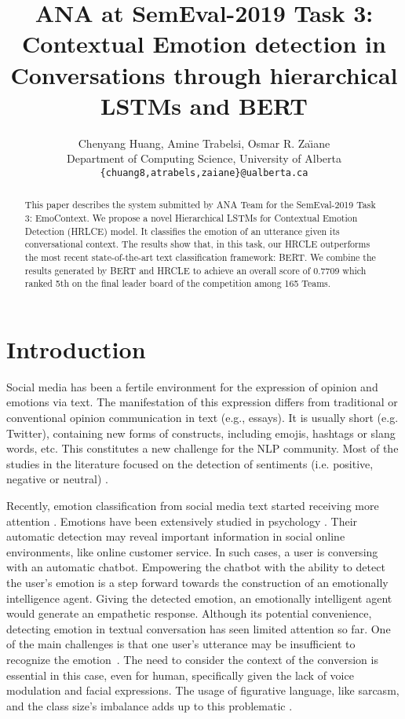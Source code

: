 \documentclass[11pt,a4paper]{article}
\title{ANA at SemEval-2019 Task 3:  Contextual Emotion detection in Conversations through hierarchical LSTMs and BERT }
\author{Chenyang Huang, Amine Trabelsi, Osmar R. Za\"{\i}ane\\
  Department of Computing Science, University of Alberta \\
  {\tt \{chuang8,atrabels,zaiane\}@ualberta.ca} \\}
\date{}
\begin{document}
\maketitle

\begin{abstract}
    This paper describes the system submitted by ANA Team for the SemEval-2019 Task 3: EmoContext.
    We propose a novel Hierarchical LSTMs for Contextual Emotion Detection (HRLCE) model. 
It classifies the emotion of an utterance given its conversational context.
    The results show that, in this task, our HRCLE outperforms the most recent state-of-the-art text classification framework: BERT. We combine the results generated by BERT and HRCLE to achieve an overall score of 0.7709 which ranked 5th on the final leader board of the competition among 165 Teams.

\end{abstract}

\section{Introduction}

Social media has been a fertile environment 
for the expression of opinion and emotions via text.
The manifestation of this expression differs from traditional or conventional opinion communication in text (e.g., essays). It is usually short (e.g. Twitter), containing new forms of constructs, including emojis, hashtags or slang words, etc. This constitutes a new challenge for the NLP community. 
Most of the studies in the literature focused on the detection  of sentiments (i.e. positive, negative or neutral)  \cite{mohammad2013crowdsourcing,kiritchenko2014sentiment}.

Recently,  emotion classification from social media text started receiving more attention \cite{Mohammad-semeval18,SentimentSurvey17}.
Emotions have been extensively studied in psychology \cite{ekman1992argument,plutchik2001}. 
Their automatic detection
may reveal important information in social online environments, like
online customer service. 
In such cases, a 
user is conversing with an automatic chatbot. 
Empowering the chatbot with the ability to detect the user's emotion is a step forward towards the construction of an emotionally intelligence agent. Giving the detected emotion, an emotionally intelligent agent would generate an empathetic response. 
Although its potential convenience, detecting emotion in textual conversation has seen limited attention so far. One of the main challenges is that one user’s utterance may be insufficient to recognize the emotion~\cite{NAACL18}.
The need to consider the context of the conversion is essential in this case, even for human, specifically given the lack of voice modulation and facial expressions. The usage of figurative language, like sarcasm, and the class size's imbalance adds up to this problematic \cite{chatterjee2019understanding}. 
\end{document}
